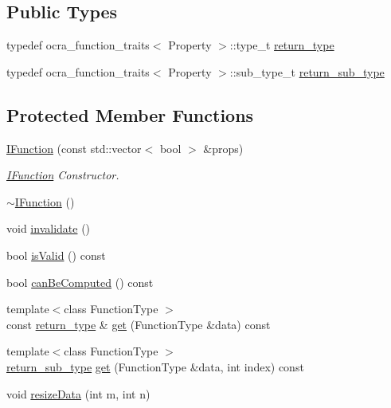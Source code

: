 \subsection*{Public Types}
{\bf }\par
\begin{DoxyCompactItemize}
\item 
typedef ocra\+\_\+function\+\_\+traits$<$ Property $>$\+::type\+\_\+t \hyperlink{classocra_1_1IFunction_a04d351c2f938d01046328b54fb7e6525}{return\+\_\+type}
\item 
typedef ocra\+\_\+function\+\_\+traits$<$ Property $>$\+::sub\+\_\+type\+\_\+t \hyperlink{classocra_1_1IFunction_ac6604adbd04613e1f545fb522cedbe3d}{return\+\_\+sub\+\_\+type}
\end{DoxyCompactItemize}

\subsection*{Protected Member Functions}
\begin{DoxyCompactItemize}
\item 
\hyperlink{classocra_1_1IFunction_a6aa2340376a035f9b80c747b09e701fa}{I\+Function} (const std\+::vector$<$ bool $>$ \&props)
\begin{DoxyCompactList}\small\item\em \hyperlink{classocra_1_1IFunction}{I\+Function} Constructor. \end{DoxyCompactList}\item 
\hyperlink{classocra_1_1IFunction_a60204ea5f57d3f369915022c9e431e32}{$\sim$\+I\+Function} ()
\item 
void \hyperlink{classocra_1_1IFunction_ae7cc0015416e006ad5682e7980f9c3d8}{invalidate} ()
\item 
bool \hyperlink{classocra_1_1IFunction_ae4b63610a30ca916d1fc1cc9ee57b66b}{is\+Valid} () const 
\item 
bool \hyperlink{classocra_1_1IFunction_a25cc0f4d5ca9f7122ea25d0a866f7276}{can\+Be\+Computed} () const 
\item 
{\footnotesize template$<$class Function\+Type $>$ }\\const \hyperlink{classocra_1_1IFunction_a04d351c2f938d01046328b54fb7e6525}{return\+\_\+type} \& \hyperlink{classocra_1_1IFunction_a6eab6c07798ad8a080e3e9aece48211b}{get} (Function\+Type \&data) const 
\item 
{\footnotesize template$<$class Function\+Type $>$ }\\\hyperlink{classocra_1_1IFunction_ac6604adbd04613e1f545fb522cedbe3d}{return\+\_\+sub\+\_\+type} \hyperlink{classocra_1_1IFunction_abd0e6caeb3b0182000bcd50054889a3a}{get} (Function\+Type \&data, int index) const 
\item 
void \hyperlink{classocra_1_1IFunction_aab980c69fa11a61cbd49dad56dddca76}{resize\+Data} (int m, int n)
\end{DoxyCompactItemize}
